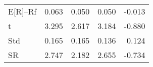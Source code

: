 \begin{tabular}{lrrrr}
\toprule
\midrule
E[R]--Rf & 0.063 & 0.050 & 0.050 & -0.013 \\
t & 3.295 & 2.617 & 3.184 & -0.880 \\
Std & 0.165 & 0.165 & 0.136 & 0.124 \\
SR & 2.747 & 2.182 & 2.655 & -0.734 \\
\bottomrule
\end{tabular}
